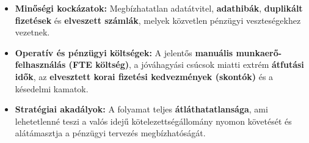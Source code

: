 \begin{itemize}
    \item \textbf{Minőségi kockázatok:} Megbízhatatlan adatátvitel, \textbf{adathibák}, \textbf{duplikált fizetések} és \textbf{elveszett számlák}, melyek közvetlen pénzügyi veszteségekhez vezetnek.
    \item \textbf{Operatív és pénzügyi költségek:} A jelentős \textbf{manuális munkaerő-felhasználás (FTE költség)}, a jóváhagyási csúcsok miatti extrém \textbf{átfutási idők}, az \textbf{elvesztett korai fizetési kedvezmények (skontók)} és a késedelmi kamatok.
    \item \textbf{Stratégiai akadályok:} A folyamat teljes \textbf{átláthatatlansága}, ami lehetetlenné teszi a valós idejű kötelezettségállomány nyomon követését és alátámasztja a pénzügyi tervezés megbízhatóságát.
\end{itemize}